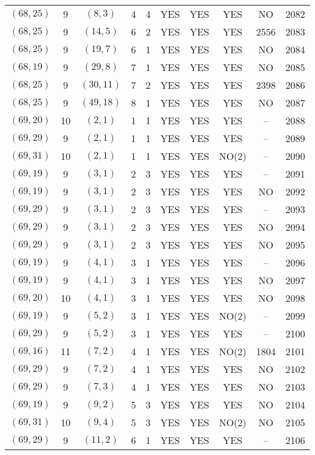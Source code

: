 \begin{longtable}{|c|c|c|c|c|c|c|c|c|c|}
$(68, 25)$ & 9 & $(8, 3)$ & 4 & 4 & YES & YES & YES & NO & 2082\\
$(68, 25)$ & 9 & $(14, 5)$ & 6 & 2 & YES & YES & YES & 2556 & 2083\\
$(68, 25)$ & 9 & $(19, 7)$ & 6 & 1 & YES & YES & YES & NO & 2084\\
$(68, 19)$ & 9 & $(29, 8)$ & 7 & 1 & YES & YES & YES & NO & 2085\\
$(68, 25)$ & 9 & $(30, 11)$ & 7 & 2 & YES & YES & YES & 2398 & 2086\\
$(68, 25)$ & 9 & $(49, 18)$ & 8 & 1 & YES & YES & YES & NO & 2087\\
$(69, 20)$ & 10 & $(2, 1)$ & 1 & 1 & YES & YES & YES & -- & 2088\\
$(69, 29)$ & 9 & $(2, 1)$ & 1 & 1 & YES & YES & YES & -- & 2089\\
$(69, 31)$ & 10 & $(2, 1)$ & 1 & 1 & YES & YES & NO(2) & -- & 2090\\
$(69, 19)$ & 9 & $(3, 1)$ & 2 & 3 & YES & YES & YES & -- & 2091\\
$(69, 19)$ & 9 & $(3, 1)$ & 2 & 3 & YES & YES & YES & NO & 2092\\
$(69, 29)$ & 9 & $(3, 1)$ & 2 & 3 & YES & YES & YES & -- & 2093\\
$(69, 29)$ & 9 & $(3, 1)$ & 2 & 3 & YES & YES & YES & NO & 2094\\
$(69, 29)$ & 9 & $(3, 1)$ & 2 & 3 & YES & YES & YES & NO & 2095\\
$(69, 19)$ & 9 & $(4, 1)$ & 3 & 1 & YES & YES & YES & -- & 2096\\
$(69, 19)$ & 9 & $(4, 1)$ & 3 & 1 & YES & YES & YES & NO & 2097\\
$(69, 20)$ & 10 & $(4, 1)$ & 3 & 1 & YES & YES & YES & NO & 2098\\
$(69, 19)$ & 9 & $(5, 2)$ & 3 & 1 & YES & YES & NO(2) & -- & 2099\\
$(69, 29)$ & 9 & $(5, 2)$ & 3 & 1 & YES & YES & YES & -- & 2100\\
$(69, 16)$ & 11 & $(7, 2)$ & 4 & 1 & YES & YES & NO(2) & 1804 & 2101\\
$(69, 29)$ & 9 & $(7, 2)$ & 4 & 1 & YES & YES & YES & NO & 2102\\
$(69, 29)$ & 9 & $(7, 3)$ & 4 & 1 & YES & YES & YES & NO & 2103\\
$(69, 19)$ & 9 & $(9, 2)$ & 5 & 3 & YES & YES & YES & NO & 2104\\
$(69, 31)$ & 10 & $(9, 4)$ & 5 & 3 & YES & YES & NO(2) & NO & 2105\\
$(69, 29)$ & 9 & $(11, 2)$ & 6 & 1 & YES & YES & YES & -- & 2106\\

\end{longtable}
